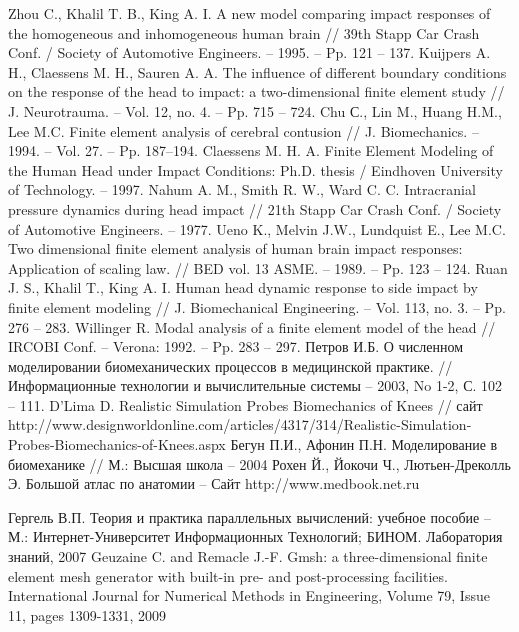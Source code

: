 \begin{thebibliography}{99}
 Zhou C., Khalil T. B., King A. I. A new model comparing impact responses of the homogeneous and inhomogeneous human brain // 39th Stapp Car Crash Conf. / Society of Automotive Engineers. – 1995. – Pp. 121 – 137.
 Kuijpers A. H., Claessens M. H., Sauren A. A. The influence of different boundary conditions on the response of the head to impact: a two-dimensional finite element study // J. Neurotrauma. – Vol. 12, no. 4. – Pp. 715 – 724.
 Chu С., Lin M., Huang H.M., Lee M.C. Finite element analysis of cerebral contusion // J. Biomechanics. – 1994. – Vol. 27. – Pp. 187–194.
 Claessens M. H. A. Finite Element Modeling of the Human Head under Impact Conditions: Ph.D. thesis / Eindhoven University of Technology. – 1997.
 Nahum A. M., Smith R. W., Ward C. C. Intracranial pressure dynamics during head impact // 21th Stapp Car Crash Conf. / Society of Automotive Engineers. – 1977. 
 Ueno K., Melvin J.W., Lundquist E., Lee M.C. Two dimensional finite element analysis of human brain impact responses: Application of scaling law. // BED vol. 13 ASME. – 1989. – Pp. 123 – 124. 
 Ruan J. S., Khalil T., King A. I. Human head dynamic response to side impact by finite element modeling // J. Biomechanical Engineering. – Vol. 113, no. 3. – Pp. 276 – 283. 
 Willinger R. Modal analysis of a finite element model of the head // IRCOBI Conf. – Verona: 1992. – Pp. 283 – 297.
 Петров И.Б. О численном моделировании биомеханических процессов в медицинской практике. // Информационные технологии и вычислительные системы – 2003, No 1-2, С. 102 – 111.
 D’Lima D. Realistic Simulation Probes Biomechanics of Knees // сайт http://www.designworldonline.com/articles/4317/314/Realistic-Simulation-Probes-Biomechanics-of-Knees.aspx
 Бегун П.И., Афонин П.Н. Моделирование в биомеханике // М.: Высшая школа -- 2004
 Рохен Й., Йокочи Ч., Лютьен-Дреколль Э. Большой атлас по анатомии – Сайт http://www.medbook.net.ru

 Гергель В.П. Теория и практика параллельных вычислений: учебное пособие – М.: Интернет-Университет Информационных Технологий; БИНОМ. Лаборатория знаний, 2007
 Geuzaine C. and Remacle J.-F. Gmsh: a three-dimensional finite element mesh generator with built-in pre- and post-processing facilities. International Journal for Numerical Methods in Engineering, Volume 79, Issue 11, pages 1309-1331, 2009

\end{thebibliography}
